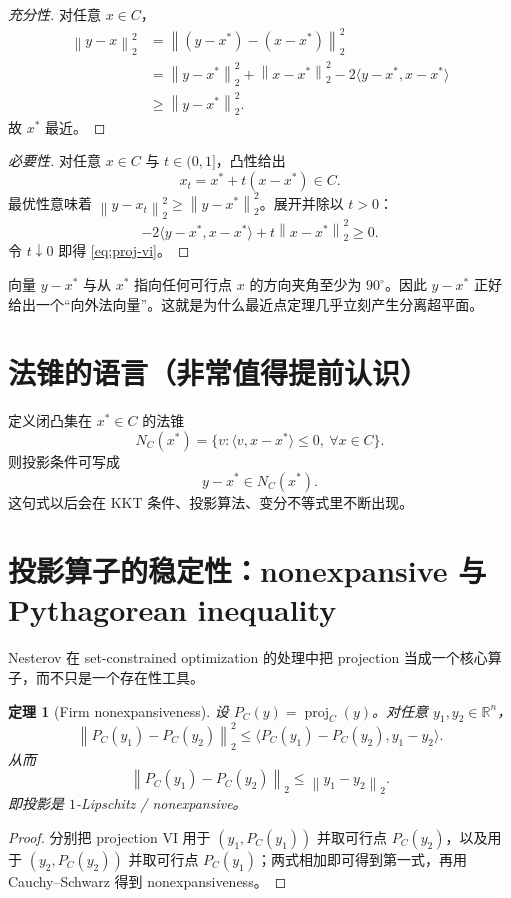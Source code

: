 \documentclass[11pt,a4paper,openany]{ctexrep}
\newtheorem{theorem}{定理}[chapter]
\theoremstyle{definition}
\newcommand{\R}{\mathbb{R}}
\newcommand{\proj}{\operatorname{proj}}
\newcommand{\inner}[2]{\langle #1,#2\rangle}
\newcommand{\norm}[1]{\left\lVert #1\right\rVert}
\begin{document}
\begin{proof}[充分性]
对任意 $x\in C$，
\begin{align*}
\norm{y-x}_2^2
&=\norm{(y-x^*)-(x-x^*)}_2^2\\
&=\norm{y-x^*}_2^2+\norm{x-x^*}_2^2
-2\inner{y-x^*}{x-x^*}\\
&\ge\norm{y-x^*}_2^2.
\end{align*}
故 $x^*$ 最近。
\end{proof}

\begin{proof}[必要性]
对任意 $x\in C$ 与 $t\in(0,1]$，凸性给出
\[
x_t=x^*+t(x-x^*)\in C.
\]
最优性意味着 $\norm{y-x_t}_2^2\ge\norm{y-x^*}_2^2$。展开并除以 $t>0$：
\[
-2\inner{y-x^*}{x-x^*}+t\norm{x-x^*}_2^2\ge0.
\]
令 $t\downarrow0$ 即得 \eqref{eq:proj-vi}。
\end{proof}

\begin{intuitionbox}[几何意义]
向量 $y-x^*$ 与从 $x^*$ 指向任何可行点 $x$ 的方向夹角至少为 $90^\circ$。因此 $y-x^*$ 正好给出一个“向外法向量”。这就是为什么最近点定理几乎立刻产生分离超平面。
\end{intuitionbox}

\section{法锥的语言（非常值得提前认识）}
定义闭凸集在 $x^*\in C$ 的法锥
\[
N_C(x^*)=\{v:\inner{v}{x-x^*}\le0,\ \forall x\in C\}.
\]
则投影条件可写成
\[
y-x^*\in N_C(x^*).
\]
这句式以后会在 KKT 条件、投影算法、变分不等式里不断出现。


\section{投影算子的稳定性：nonexpansive 与 Pythagorean inequality}
Nesterov 在 set-constrained optimization 的处理中把 projection 当成一个核心算子，而不只是一个存在性工具。\cite[\S2.2.3]{nesterov}

\begin{theorem}[Firm nonexpansiveness]
设 $P_C(y)=\proj_C(y)$。对任意 $y_1,y_2\in\R^n$，
\[
\norm{P_C(y_1)-P_C(y_2)}_2^2
\le
\inner{P_C(y_1)-P_C(y_2)}{y_1-y_2}.
\]
从而
\[
\norm{P_C(y_1)-P_C(y_2)}_2\le \norm{y_1-y_2}_2.
\]
即投影是 $1$-Lipschitz / nonexpansive。
\end{theorem}
\begin{proof}
分别把 projection VI 用于 $(y_1,P_C(y_1))$ 并取可行点 $P_C(y_2)$，以及用于 $(y_2,P_C(y_2))$ 并取可行点 $P_C(y_1)$；两式相加即可得到第一式，再用 Cauchy--Schwarz 得到 nonexpansiveness。
\end{proof}
\end{document}
